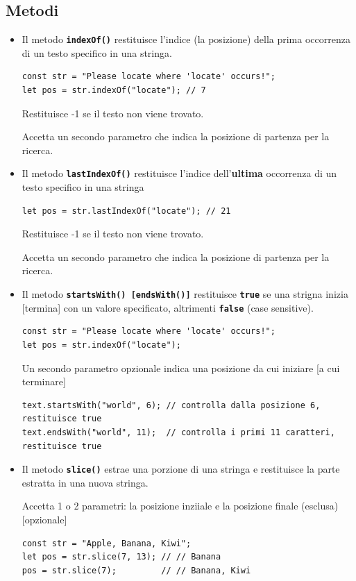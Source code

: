 \subsection{Metodi}
\begin{itemize}
    \item Il metodo \textbf{\texttt{indexOf()}} restituisce l'indice (la posizione) della prima occorrenza di un testo specifico in una stringa.

    \begin{lstlisting}
const str = "Please locate where 'locate' occurs!";
let pos = str.indexOf("locate"); // 7
    \end{lstlisting}

    Restituisce -1 se il testo non viene trovato.
    
    Accetta un secondo parametro che indica la posizione di partenza per la ricerca.

    \item Il metodo \textbf{\texttt{lastIndexOf()}} restituisce l'indice dell'\textbf{ultima} occorrenza di un testo specifico in una stringa
    \begin{lstlisting}
let pos = str.lastIndexOf("locate"); // 21
    \end{lstlisting}

    Restituisce -1 se il testo non viene trovato.
    
    Accetta un secondo parametro che indica la posizione di partenza per la ricerca.

    \item Il metodo \textbf{\texttt{startsWith() [endsWith()]}} restituisce \textbf{\texttt{true}} se una strigna inizia [termina] con un valore specificato, altrimenti \textbf{\texttt{false}} (case sensitive).
    \begin{lstlisting}
const str = "Please locate where 'locate' occurs!";
let pos = str.indexOf("locate");
    \end{lstlisting}

    Un secondo parametro opzionale indica una posizione da cui iniziare [a cui terminare]
    \begin{lstlisting}
text.startsWith("world", 6); // controlla dalla posizione 6, restituisce true
text.endsWith("world", 11);  // controlla i primi 11 caratteri, restituisce true
    \end{lstlisting}

    \item Il metodo \textbf{\texttt{slice()}} estrae una porzione di una stringa e restituisce la parte estratta in una nuova stringa.

    Accetta 1 o 2 parametri: la posizione inziiale e la posizione finale (esclusa) [opzionale]
    \begin{lstlisting}
const str = "Apple, Banana, Kiwi";
let pos = str.slice(7, 13); // // Banana
pos = str.slice(7);         // // Banana, Kiwi
    \end{lstlisting}
\end{itemize}

